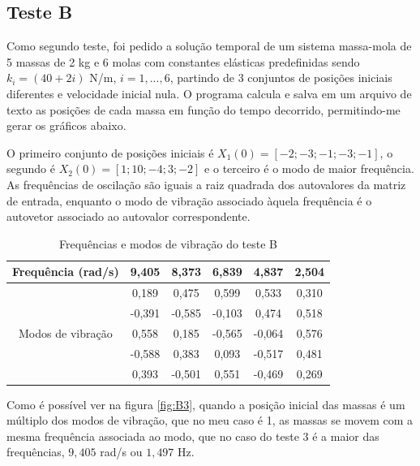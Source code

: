\documentclass[12pt]{article} %
\begin{document}
        \newpage
    
    \subsection{Teste B}
    
        Como segundo teste, foi pedido a solução temporal de um sistema massa-mola de 5 massas de 2 kg e 6 molas com constantes elásticas predefinidas sendo $k_i = (40+2i)$ N/m, $i = 1,...,6$, partindo de 3 conjuntos de posições iniciais diferentes e velocidade inicial nula. O programa calcula e salva em um arquivo de texto as posições de cada massa em função do tempo decorrido, permitindo-me gerar os gráficos abaixo.
        
        O primeiro conjunto de posições iniciais é $X_1(0) = [-2;-3;-1;-3;-1]$, o segundo é $X_2(0) = [1;10;-4;3;-2]$ e o terceiro é o modo de maior frequência. As frequências de oscilação são iguais a raiz quadrada dos autovalores da matriz de entrada, enquanto o modo de vibração associado àquela frequência é o autovetor associado ao autovalor correspondente.
        
        \begin{table}[h]
            \centering
            \begin{tabular}{|c|c|c|c|c|c|} 
                \hline
                Frequência (rad/s) &  9,405 &  8,373 &  6,839 &  4,837 &  2,504 \\
                \hline\hline
                                   &  0,189 &  0,475 &  0,599 &  0,533 &  0,310 \\ 
                                   & -0,391 & -0,585 & -0,103 &  0,474 &  0,518 \\
                Modos de vibração  &  0,558 &  0,185 & -0,565 & -0,064 &  0,576 \\
                                   & -0,588 &  0,383 &  0,093 & -0,517 &  0,481 \\
                                   &  0,393 & -0,501 &  0,551 & -0,469 &  0,269 \\
                \hline
            \end{tabular}
            \caption{Frequências e modos de vibração do teste B}
            \label{tab:freqB}
        \end{table}
        
        Como é possível ver na figura \ref{fig:B3}, quando a posição inicial das massas é um múltiplo dos modos de vibração, que no meu caso é 1, as massas se movem com a mesma frequência associada ao modo, que no caso do teste 3 é a maior das frequências, $9,405$ rad/s ou $1,497$ Hz. 
    
\end{document}
